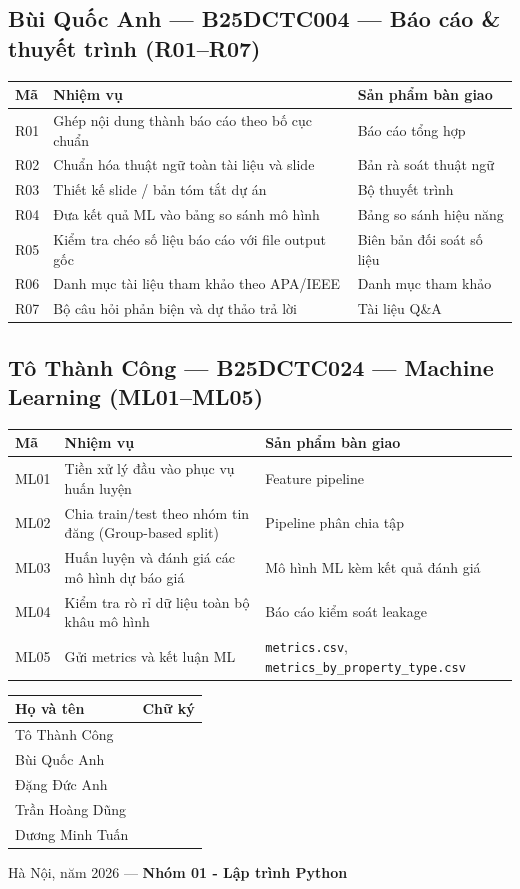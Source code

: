 \documentclass[10pt,a4paper]{article}
\newcommand{\mem}[1]{\subsection*{#1}\vspace{-2pt}}
\begin{document}
\mem{Bùi Quốc Anh --- B25DCTC004 --- Báo cáo \& thuyết trình (R01--R07)}
\begin{longtable}{@{}p{.9cm}p{8.3cm}p{6.2cm}@{}}
\toprule\textbf{Mã} & \textbf{Nhiệm vụ} & \textbf{Sản phẩm bàn giao}\\\midrule\endhead
R01 & Ghép nội dung thành báo cáo theo bố cục chuẩn & Báo cáo tổng hợp\\
R02 & Chuẩn hóa thuật ngữ toàn tài liệu và slide & Bản rà soát thuật ngữ\\
R03 & Thiết kế slide / bản tóm tắt dự án & Bộ thuyết trình\\
R04 & Đưa kết quả ML vào bảng so sánh mô hình & Bảng so sánh hiệu năng\\
R05 & Kiểm tra chéo số liệu báo cáo với file output gốc & Biên bản đối soát số liệu\\
R06 & Danh mục tài liệu tham khảo theo APA/IEEE & Danh mục tham khảo\\
R07 & Bộ câu hỏi phản biện và dự thảo trả lời & Tài liệu Q\&A\\\bottomrule
\end{longtable}

\mem{Tô Thành Công --- B25DCTC024 --- Machine Learning (ML01--ML05)}
\begin{longtable}{@{}p{.9cm}p{8.3cm}p{6.2cm}@{}}
\toprule\textbf{Mã} & \textbf{Nhiệm vụ} & \textbf{Sản phẩm bàn giao}\\\midrule\endhead
ML01 & Tiền xử lý đầu vào phục vụ huấn luyện & Feature pipeline\\
ML02 & Chia train/test theo nhóm tin đăng (Group-based split) & Pipeline phân chia tập\\
ML03 & Huấn luyện và đánh giá các mô hình dự báo giá & Mô hình ML kèm kết quả đánh giá\\
ML04 & Kiểm tra rò rỉ dữ liệu toàn bộ khâu mô hình & Báo cáo kiểm soát leakage\\
ML05 & Gửi metrics và kết luận ML & \texttt{metrics.csv}, \texttt{metrics\_by\_property\_type.csv}\\\bottomrule
\end{longtable}

\vspace{.6cm}
\begin{tabular}{@{}p{5cm}p{5cm}@{}}
\textbf{Họ và tên} & \textbf{Chữ ký}\\\midrule
Tô Thành Công & \\[.55cm]
Bùi Quốc Anh & \\[.55cm]
Đặng Đức Anh & \\[.55cm]
Trần Hoàng Dũng & \\[.55cm]
Dương Minh Tuấn & \\[.55cm]
\end{tabular}
\vfill\begin{flushright}Hà Nội, năm 2026 --- \textbf{Nhóm 01 - Lập trình Python}\end{flushright}
\end{document}
